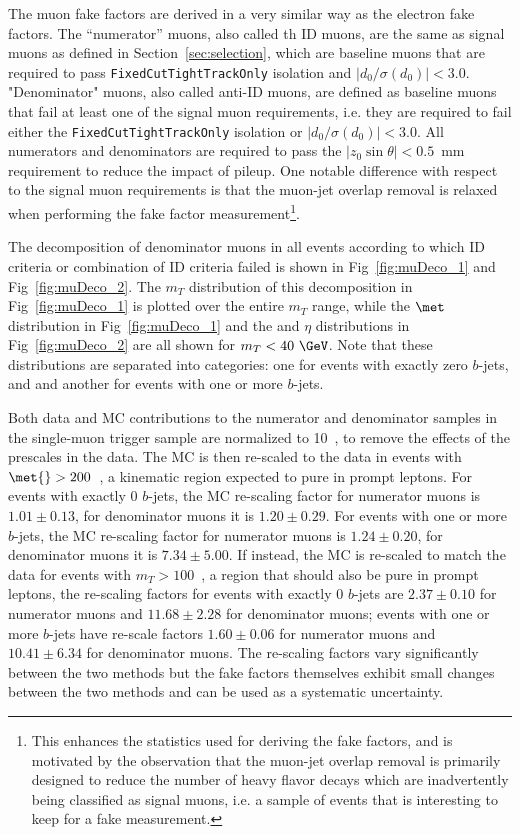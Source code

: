  \FloatBarrier


The muon fake factors are derived in a very similar way as the electron fake factors.  The ``numerator'' muons, also called th ID muons, are the same as signal muons as defined in Section~\ref{sec:selection}, which are baseline muons that are required to pass \texttt{FixedCutTightTrackOnly} isolation and $|d_0/\sigma(d_0)|<3.0$.  "Denominator" muons, also called anti-ID muons, are defined as baseline muons that fail at least one of the signal muon requirements, i.e. they are required to fail either the \texttt{FixedCutTightTrackOnly} isolation or $|d_0/\sigma(d_0)|<3.0$. All numerators and denominators are required to pass the $|z_0\sin\theta| < 0.5$~mm requirement to reduce the impact of pileup.  One notable difference with respect to the signal muon requirements is that the muon-jet overlap removal is relaxed when performing the fake factor measurement\footnote{This enhances the statistics used for deriving the fake factors, and is motivated by the observation that the muon-jet overlap removal is primarily designed to reduce the number of heavy flavor decays which are inadvertently being classified as signal muons, i.e. a sample of events that is interesting to keep for a fake measurement.}.

The decomposition of denominator muons in all events according to which ID criteria or combination of ID criteria failed is shown in Fig~\ref{fig:muDeco_1} and Fig~\ref{fig:muDeco_2}. The  $m_{T}$ distribution of this decomposition in Fig~\ref{fig:muDeco_1} is plotted over the entire $m_{T}$ range, while the $\met$ distribution in Fig~\ref{fig:muDeco_1} and the \pt{} and $\eta$ distributions in Fig~\ref{fig:muDeco_2} are all shown for $m_{T} <40~\GeV$.  Note that these distributions are separated into categories: one for events with exactly zero $b$-jets, and and another for events with one or more $b$-jets.

Both data and MC contributions to the numerator and denominator samples in the single-muon trigger sample are normalized to 10~\ipb, to remove the effects of the prescales in the data.  The MC is then re-scaled to the data in events with $\met{}>200$~\GeV, a kinematic region expected to pure in prompt leptons.  For events with exactly 0 $b$-jets, the MC re-scaling factor for numerator muons is $1.01 \pm 0.13$, for denominator muons it is $1.20\pm 0.29$. For events with one or more $b$-jets, the MC re-scaling factor for numerator muons is $1.24 \pm 0.20$, for denominator muons it is $7.34\pm 5.00$. If instead, the MC is re-scaled to match the data for events with $m_{T} > 100$~\GeV, a region that should also be pure in prompt leptons, the re-scaling factors for events with exactly 0 $b$-jets are $2.37 \pm 0.10$ for numerator muons and $11.68 \pm 2.28$ for denominator muons; events with one or more $b$-jets have re-scale factors $1.60 \pm 0.06$ for numerator muons and $10.41 \pm 6.34$ for denominator muons. The re-scaling factors vary significantly between the two methods but the fake factors themselves exhibit small changes between the two methods and can be used as a systematic uncertainty.

